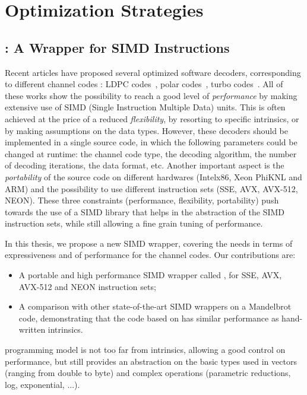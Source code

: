 
\graphicspath{{main/chapter3/fig/}}

\chapter{Optimization Strategies}
\label{chap:opt}

\vspace*{\fill}
\minitoccustom
\vspace*{\fill}

\newpage
\section{\MIPP: A \Cxx Wrapper for SIMD Instructions}

Recent articles have proposed several optimized software decoders, corresponding
to different channel codes : LDPC codes~\cite{LeGal2015,LeGal2016,LeGal2017a},
polar codes~\cite{Giard2016b,Sarkis2016,Cassagne2015c,Cassagne2016b,
Leonardon2019}, turbo codes~\cite{Zhang2012,Wu2013,Cassagne2016a,LeGal2019a}.
All of these works show the possibility to reach a good level of
\textit{performance} by making extensive use of SIMD (Single Instruction
Multiple Data) units. This is often achieved at the price of a reduced
\textit{flexibility}, by resorting to specific intrinsics, or by making
assumptions on the data types. However, these decoders should be implemented in
a single source code, in which the following parameters could be changed at
runtime: the channel code type, the decoding algorithm, the number of decoding
iterations, the data format, etc. Another important aspect is the
\textit{portability} of the source code on different hardwares (Intel\R x86,
Xeon Phi\TM KNL and ARM\R) and the possibility to use different instruction sets
(SSE, AVX, AVX-512, NEON). These three constraints (performance, flexibility,
portability) push towards the use of a SIMD library that helps in the
abstraction of the SIMD instruction sets, while still allowing a fine grain
tuning of performance.

In this thesis, we propose a new \Cxx SIMD wrapper, covering the needs in terms
of expressiveness and of performance for the channel codes. Our contributions
are:
\begin{itemize}
  \item A portable and high performance  \Cxx SIMD wrapper called \MIPP, for
    SSE, AVX, AVX-512 and NEON instruction sets;
  \item A comparison with other state-of-the-art SIMD wrappers on a Mandelbrot
    code, demonstrating that the code based on \MIPP has similar performance as
    hand-written intrinsics.
\end{itemize}
\MIPP programming model is not too far from intrinsics, allowing a good control
on performance, but still provides an abstraction on the basic types used in
vectors (ranging from double to byte) and complex operations (parametric
reductions, log, exponential, ...).

